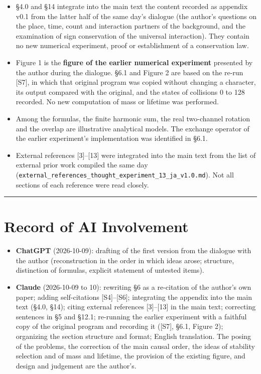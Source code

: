 \documentclass[
  a4paper,
]{article}
\providecommand{\tightlist}{%
  \setlength{\itemsep}{0pt}\setlength{\parskip}{0pt}}
\begin{document}
\begin{itemize}
\tightlist
\item
  §4.0 and §14 integrate into the main text the content recorded as
  appendix v0.1 from the latter half of the same day's dialogue (the
  author's questions on the place, time, count and interaction partners
  of the background, and the examination of sign conservation of the
  universal interaction). They contain no new numerical experiment,
  proof or establishment of a conservation law.
\item
  Figure 1 is the \textbf{figure of the earlier numerical experiment}
  presented by the author during the dialogue. §6.1 and Figure 2 are
  based on the re-run {[}S7{]}, in which that original program was
  copied without changing a character, its output compared with the
  original, and the states of collisions 0 to 128 recorded. No new
  computation of mass or lifetime was performed.
\item
  Among the formulas, the finite harmonic sum, the real two-channel
  rotation and the overlap are illustrative analytical models. The
  exchange operator of the earlier experiment's implementation was
  identified in §6.1.
\item
  External references {[}3{]}--{[}13{]} were integrated into the main
  text from the list of external prior work compiled the same day
  (\texttt{external\_\allowbreak{}references\_\allowbreak{}thought\_\allowbreak{}experiment\_\allowbreak{}13\_\allowbreak{}ja\_\allowbreak{}v1.0.md}).
  Not all sections of each reference were read closely.
\end{itemize}

\begin{center}\rule{0.5\linewidth}{0.5pt}\end{center}

\section{Record of AI Involvement}\label{record-of-ai-involvement}

\begin{itemize}
\tightlist
\item
  \textbf{ChatGPT} (2026-10-09): drafting of the first version from the
  dialogue with the author (reconstruction in the order in which ideas
  arose; structure, distinction of formulas, explicit statement of
  untested items).
\item
  \textbf{Claude} (2026-10-09 to 10): rewriting §6 as a re-citation of
  the author's own paper; adding self-citations {[}S4{]}--{[}S6{]};
  integrating the appendix into the main text (§4.0, §14); citing
  external references {[}3{]}--{[}13{]} in the main text; correcting
  sentences in §5 and §12.1; re-running the earlier experiment with a
  faithful copy of the original program and recording it ({[}S7{]},
  §6.1, Figure 2); organizing the section structure and format; English
  translation. The posing of the problems, the correction of the main
  causal order, the ideas of stability selection and of mass and
  lifetime, the provision of the existing figure, and design and
  judgement are the author's.
\end{itemize}
\end{document}
